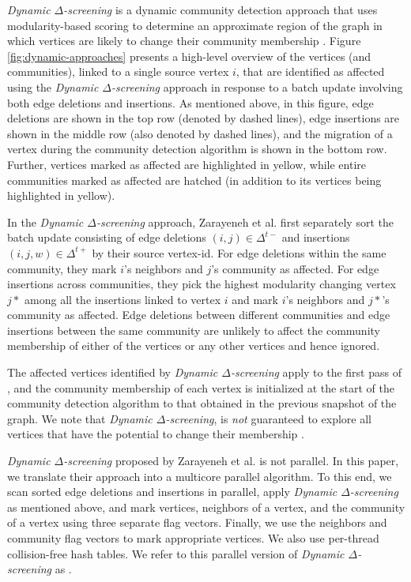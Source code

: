 \textit{Dynamic $\Delta$-screening} is a dynamic community detection approach that uses modularity-based scoring to determine an approximate region of the graph in which vertices are likely to change their community membership \cite{com-zarayeneh21}. Figure \ref{fig:dynamic-approaches} presents a high-level overview of the vertices (and communities), linked to a single source vertex $i$, that are identified as affected using the \textit{Dynamic $\Delta$-screening} approach in response to a batch update involving both edge deletions and insertions. As mentioned above, in this figure, edge deletions are shown in the top row (denoted by dashed lines), edge insertions are shown in the middle row (also denoted by dashed lines), and the migration of a vertex during the community detection algorithm is shown in the bottom row. Further, vertices marked as affected are highlighted in yellow, while entire communities marked as affected are hatched (in addition to its vertices being highlighted in yellow).

In the \textit{Dynamic $\Delta$-screening} approach, Zarayeneh et al. first separately sort the batch update consisting of edge deletions $(i, j) \in \Delta^{t-}$ and insertions $(i, j, w) \in \Delta^{t+}$ by their source vertex-id. For edge deletions within the same community, they mark $i$'s neighbors and $j$'s community as affected. For edge insertions across communities, they pick the highest modularity changing vertex $j*$ among all the insertions linked to vertex $i$ and mark $i$'s neighbors and $j*$'s community as affected. Edge deletions between different communities and edge insertions between the same community are unlikely to affect the community membership of either of the vertices or any other vertices and hence ignored.

The affected vertices identified by \textit{Dynamic $\Delta$-screening} apply to the first pass of \Lou{}, and the community membership of each vertex is initialized at the start of the community detection algorithm to that obtained in the previous snapshot of the graph. We note that \textit{Dynamic $\Delta$-screening}, is \textit{not} guaranteed to explore all vertices that have the potential to change their membership \cite{com-zarayeneh21}.

\textit{Dynamic $\Delta$-screening} proposed by Zarayeneh et al. \cite{com-zarayeneh21} is not parallel. In this paper, we translate their approach into a multicore parallel algorithm. To this end, we scan sorted edge deletions and insertions in parallel, apply \textit{Dynamic $\Delta$-screening} as mentioned above, and mark vertices, neighbors of a vertex, and the community of a vertex using three separate flag vectors. Finally, we use the neighbors and community flag vectors to mark appropriate vertices. We also use per-thread collision-free hash tables. We refer to this parallel version of \textit{Dynamic $\Delta$-screening} as \Del{}.
